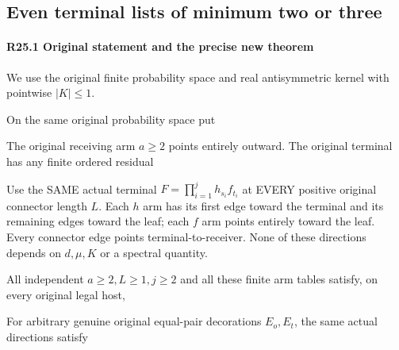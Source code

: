 \subsection{Even terminal lists of minimum two or three}\label{proof:R2-C025}

\paragraph{R25.1 Original statement and the precise new theorem}

We use the original finite probability space and real antisymmetric kernel with pointwise \(\lvert K\rvert\le1\).

On the same original probability space put


The original receiving arm \(a\ge 2\) points entirely outward. The original terminal has any finite ordered residual


Use the SAME actual terminal \(F=\prod_{i=1}^j h_{s_{i}} f_{t_{i}}\) at EVERY positive original connector length \(L\). Each \(h\) arm has its first edge toward the terminal and its remaining edges toward the leaf; each \(f\) arm points entirely toward the leaf. Every connector edge points terminal-to-receiver. None of these directions depends on \(d,\allowbreak \allowbreak  \mu,\allowbreak \allowbreak  K\) or a spectral quantity.

\begin{lemma}\label{lem:R25:even-mask}
All independent \(a\ge 2,\allowbreak \allowbreak L\ge 1,\allowbreak \allowbreak j\ge 2\) and all these finite arm tables satisfy, on every original legal host,


For arbitrary genuine original equal-pair decorations \(E_o,\allowbreak \allowbreak E_t\), the same actual directions satisfy


\end{lemma}

